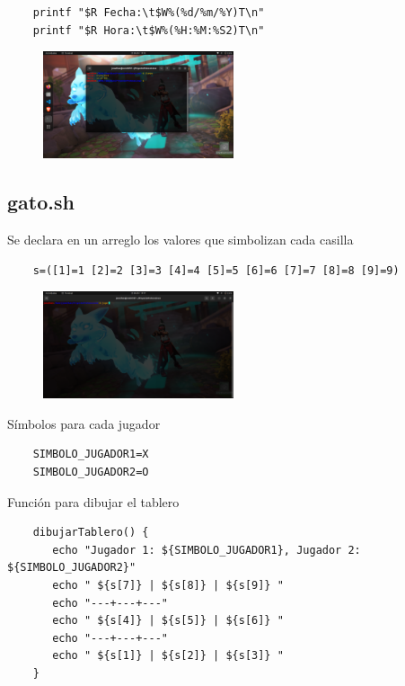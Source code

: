 \documentclass[letterpaper,12pt]{article} %
\begin{document}
\begin{verbatim}
    printf "$R Fecha:\t$W%(%d/%m/%Y)T\n"
    printf "$R Hora:\t$W%(%H:%M:%S2)T\n"
\end{verbatim}

\begin{figure}[H]
    \centering
    \includegraphics[width=0.5\textwidth]{figurasShell/Tiempo.png}
\end{figure}

\subsection{gato.sh}

    Se declara en un arreglo los valores que simbolizan cada casilla

\begin{verbatim}
    s=([1]=1 [2]=2 [3]=3 [4]=4 [5]=5 [6]=6 [7]=7 [8]=8 [9]=9)
\end{verbatim}
\begin{figure}[H]
    \centering
    \includegraphics[width=0.5\textwidth]{figurasShell/Jugar1.png}
\end{figure}

    Símbolos para cada jugador
\begin{verbatim}
    SIMBOLO_JUGADOR1=X
    SIMBOLO_JUGADOR2=O
\end{verbatim}
    Función para dibujar el tablero

\begin{verbatim}
    dibujarTablero() {
	   echo "Jugador 1: ${SIMBOLO_JUGADOR1}, Jugador 2: ${SIMBOLO_JUGADOR2}"
	   echo " ${s[7]} | ${s[8]} | ${s[9]} "
	   echo "---+---+---"
	   echo " ${s[4]} | ${s[5]} | ${s[6]} "
	   echo "---+---+---"
	   echo " ${s[1]} | ${s[2]} | ${s[3]} "
    }
\end{verbatim}
\end{document}
